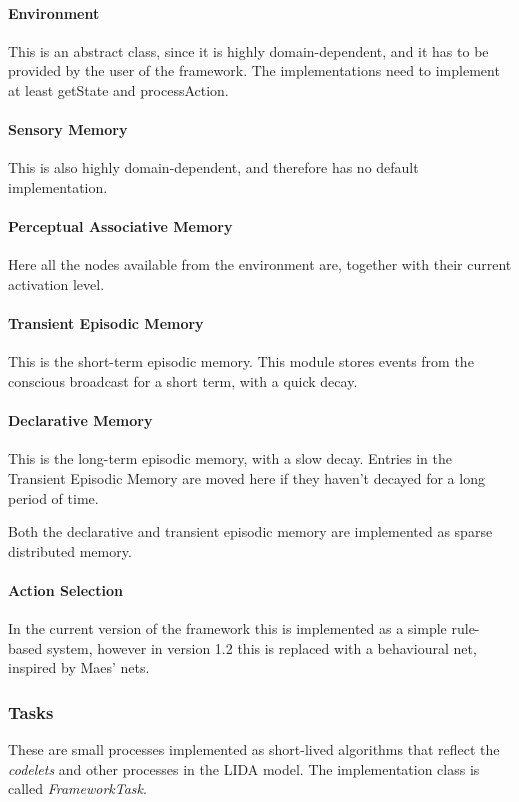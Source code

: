 \paragraph{Environment} This is an abstract class, since it is highly domain-dependent, and it has to be provided by the user of the framework. The implementations need to implement at least getState and processAction.
\paragraph{Sensory Memory} This is also highly domain-dependent, and therefore has no default implementation.
\paragraph{Perceptual Associative Memory} Here all the nodes available from the environment are, together with their current activation level.
\paragraph{Transient Episodic Memory} This is the short-term episodic memory. This module stores events from the conscious broadcast for a short term, with a quick decay.
\paragraph{Declarative Memory} This is the long-term episodic memory, with a slow decay. Entries in the Transient Episodic Memory are moved here if they haven't decayed for a long period of time.

Both the declarative and transient episodic memory are implemented as sparse distributed memory.\cite{kanerva1988sparse}

\paragraph{Action Selection} In the current version of the framework this is implemented as a simple rule-based system, however in version 1.2 this is replaced with a behavioural net, inspired by Maes' nets.\cite{maes1989right}

\subsubsection{Tasks}
These are small processes implemented as short-lived algorithms that reflect the {\em codelets} and other processes in the LIDA model. The implementation class is called {\em FrameworkTask}.


